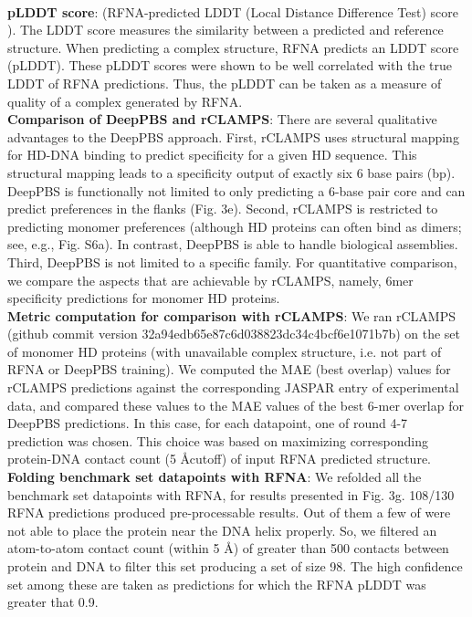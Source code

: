 \\
\textbf{pLDDT score}: (RFNA-predicted LDDT (Local Distance Difference Test) score \citep{Mariani2013}). The LDDT score measures the similarity between a predicted and reference structure. When predicting a complex structure, RFNA predicts an LDDT score (pLDDT). These pLDDT scores were shown \citep{baek2024na} to be well correlated with the true LDDT of RFNA predictions. Thus, the pLDDT can be taken as a measure of quality of a complex generated by RFNA.
\\
\textbf{Comparison of DeepPBS and rCLAMPS}: There are several qualitative advantages to the DeepPBS approach. First, rCLAMPS uses structural mapping for HD-DNA binding to predict specificity for a given HD sequence. This structural mapping leads to a specificity output of exactly six 6 base pairs (bp). DeepPBS is functionally not limited to only predicting a 6-base pair core and can predict preferences in the flanks (Fig. 3e). Second, rCLAMPS is restricted to predicting monomer preferences (although HD proteins can often bind as dimers; see, e.g., Fig. S6a). In contrast, DeepPBS is able to handle biological assemblies. Third, DeepPBS is not limited to a specific family. For quantitative comparison, we compare the aspects that are achievable by rCLAMPS, namely, 6mer specificity predictions for monomer HD proteins.
\\
\textbf{Metric computation for comparison with rCLAMPS}: We ran rCLAMPS (github commit version 32a94edb65e87c6d038823dc34c4bcf6e1071b7b) on the set of monomer HD proteins (with unavailable complex structure, i.e. not part of RFNA or DeepPBS training). We computed the MAE (best overlap) values for rCLAMPS predictions against the corresponding JASPAR entry of experimental data, and compared these values to the MAE values of the best 6-mer overlap for DeepPBS predictions. In this case, for each datapoint, one of round 4-7 prediction was chosen. This choice was based on maximizing corresponding protein-DNA contact count (5 \AA cutoff) of input RFNA predicted structure. 
\\
\textbf{Folding benchmark set datapoints with RFNA}: We refolded all the benchmark set datapoints with RFNA, for results presented in Fig. 3g. 108/130 RFNA predictions produced pre-processable results. Out of them a few of were not able to place the protein near the DNA helix properly. So, we filtered an atom-to-atom contact count (within 5 \AA) of greater than 500 contacts between protein and DNA to filter this set producing a set of size 98. The high confidence set among these are taken as predictions for which the RFNA pLDDT was greater that 0.9.

